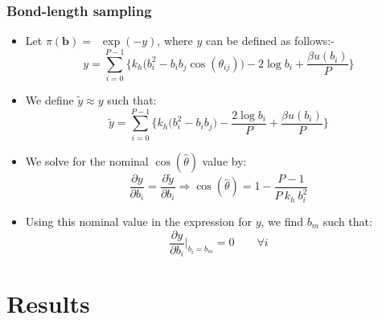 \documentclass[xcolor=svgnames]{beamer}
\begin{document}
        \begin{frame}
            \frametitle{Bond-length sampling}
            \begin{itemize}
                \item Let $\pi(\mathbf{b}) = $~$ \exp (-y)$, where $y$ can be defined as follows:-
                \begin{equation*}
                \label{eq:y}
                    y = \displaystyle\sum\limits_{i=0}^{P-1} \Bigg\{ k_h  \Big( b_i^2 - b_i  b_j  \cos (\theta_{ij}) \Big) - 2  \log b_i + \frac{ \beta  u (b_i)}{P} \Bigg\}
                \end{equation*}
                \item We define $\tilde y \approx y$ such that: 
                \begin{equation*}
                \label{eq:ytilde}
                    \tilde y = \displaystyle\sum\limits_{i=0}^{P-1} \Bigg\{ k_h  \Big( b_i^2 - b_i  b_j \Big) - \frac{2  \log b_i}{P} + \frac{ \beta  u (b_i)}{P} \Bigg\}
                \end{equation*}
                \item We solve for the nominal $\cos (\hat \theta)$ value by:
                \begin{equation*}
                \label{eq:thetaHat}
                    \frac{\partial y}{\partial b_i} = \frac{\partial \tilde y}{\partial b_i} \Rightarrow \cos (\hat \theta) = 1 - \frac{P-1}{P~k_h~b_i^2}
                \end{equation*}
                \item Using this nominal value in the expression for $y$, we find $b_m$ such that:
                \begin{equation*}
                \label{eq:bm}
                    \displaystyle\frac{\partial y}{\partial b_i} \bigg|_{b_i = b_m} = 0 \qquad \forall i
                \end{equation*}
            \end{itemize}
        \end{frame}
	\section{Results}
\end{document}
